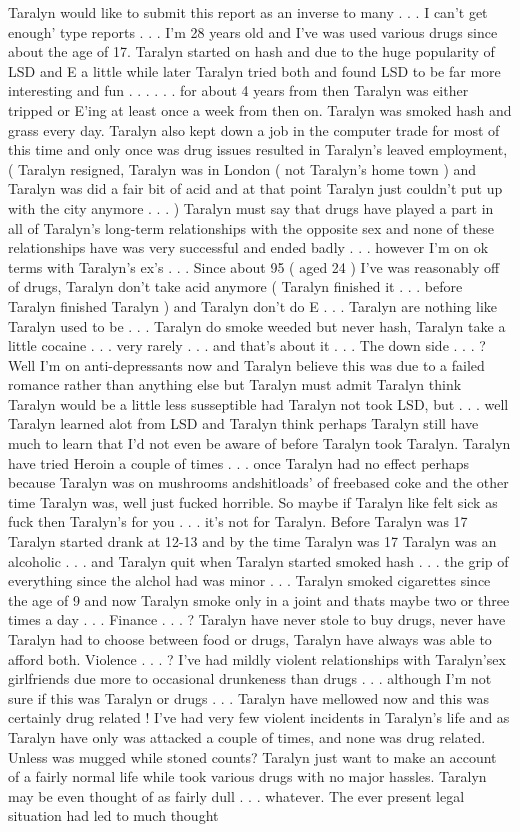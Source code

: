 \documentclass[12pt]{book}
\begin{document}
Taralyn would like to submit this report as an inverse to many . . . I can't get enough' type reports . . .  I'm 28 years old and I've was used various drugs since about the age of 17. Taralyn started on hash and due to the huge popularity of LSD and E a little while later Taralyn tried both and found LSD to be far more interesting and fun . . .   . . .  for about 4 years from then Taralyn was either tripped or E'ing at least once a week from then on. Taralyn was smoked hash and grass every day. Taralyn also kept down a job in the computer trade for most of this time and only once was drug issues resulted in Taralyn's leaved employment, ( Taralyn resigned, Taralyn was in London ( not Taralyn's home town ) and Taralyn was did a fair bit of acid and at that point Taralyn just couldn't put up with the city anymore . . .   ) Taralyn must say that drugs have played a part in all of Taralyn's long-term relationships with the opposite sex and none of these relationships have was very successful and ended badly . . .  however I'm on ok terms with Taralyn's ex's . . .  Since about 95 ( aged 24 ) I've was reasonably off of drugs, Taralyn don't take acid anymore ( Taralyn finished it . . .  before Taralyn finished Taralyn ) and Taralyn don't do E . . .  Taralyn are nothing like Taralyn used to be . . .  Taralyn do smoke weeded but never hash, Taralyn take a little cocaine  . . .  very rarely  . . .  and that's about it . . .  The down side . . .  ? Well I'm on anti-depressants now and Taralyn believe this was due to a failed romance rather than anything else but Taralyn must admit Taralyn think Taralyn would be a little less susseptible had Taralyn not took LSD, but . . .  well Taralyn learned alot from LSD and Taralyn think perhaps Taralyn still have much to learn that I'd not even be aware of before Taralyn took Taralyn. Taralyn have tried Heroin a couple of times . . .  once Taralyn had no effect perhaps because Taralyn was on mushrooms andshitloads' of freebased coke and the other time Taralyn was, well just fucked horrible. So maybe if Taralyn like felt sick as fuck then Taralyn's for you . . .  it's not for Taralyn. Before Taralyn was 17 Taralyn started drank at 12-13 and by the time Taralyn was 17 Taralyn was an alcoholic . . .  and Taralyn quit when Taralyn started smoked hash . . .  the grip of everything since the alchol had was minor . . .  Taralyn smoked cigarettes since the age of 9 and now Taralyn smoke only in a joint and thats maybe two or three times a day . . .  Finance . . .  ? Taralyn have never stole to buy drugs, never have Taralyn had to choose between food or drugs, Taralyn have always was able to afford both. Violence . . .  ? I've had mildly violent relationships with Taralyn'sex girlfriends due more to occasional drunkeness than drugs . . .  although I'm not sure if this was Taralyn or drugs . . .  Taralyn have mellowed now and this was certainly drug related ! I've had very few violent incidents in Taralyn's life and as Taralyn have only was attacked a couple of times, and none was drug related. Unless was mugged while stoned counts? Taralyn just want to make an account of a fairly normal life while took various drugs with no major hassles. Taralyn may be even thought of as fairly dull . . .  whatever. The ever present legal situation had led to much thought 
\end{document}
